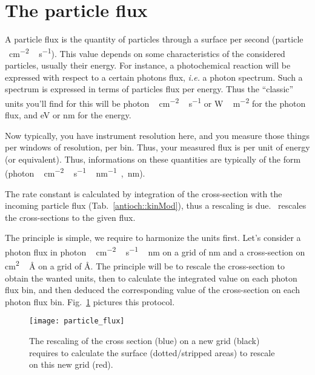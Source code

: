 \section{The particle flux}

A particle flux is the quantity of particles through
a surface per second (\unit{particle\,cm^{-2}\,s^{-1}}). This
value depends on some characteristics of the considered
particles, usually their energy. For instance, a photochemical
reaction will be expressed with respect to a certain photons
flux, \textit{i.e.} a photon spectrum. Such a spectrum is
expressed in terms of particles flux per energy. Thus the
``classic'' units you'll find for this will be
  \unit{photon\,cm^{-2}\,s^{-1}} or \unit{W\,m^{-2}} 
for the photon flux, and
  \unit{eV} or \unit{nm}
for the energy. 

Now typically, you have instrument resolution here, and you
measure those things per windows of resolution, per bin. Thus,
your measured flux is per unit of energy (or equivalent). Thus,
informations on these quantities are typically of the form
(\unit{photon\,cm^{-2}\,s^{-1}\,nm^{-1}}~,~\unit{nm}).

The rate constant is calculated by integration of the
cross-section with the incoming particle flux 
(Tab.~\ref{antioch::kinMod}), thus a rescaling
is due. \Antioch\ rescales the cross-sections to the given
flux.

The principle is simple, we require to harmonize the units first. Let's
consider a photon flux in \unit{photon\,cm^{-2}\,s^{-1}\,nm}
on a grid of \unit{nm} and a cross-section on \unit{cm^2\,\AA}
on a grid of \unit{\AA}. The principle will be to rescale
the cross-section to obtain the wanted units, then to calculate
the integrated value on each photon flux bin, and then deduced
the corresponding value of the cross-section on each photon
flux bin. Fig.~\ref{dev:particle_flux_rescaling} pictures
this protocol.

\begin{figure}
\centering
\texttt{[image: particle\_flux]}
\caption{\label{dev:particle_flux_rescaling}The rescaling of the cross section (blue) on
a new grid (black) requires to calculate the surface (dotted/stripped areas) to rescale
on this new grid (red).}
\end{figure}
